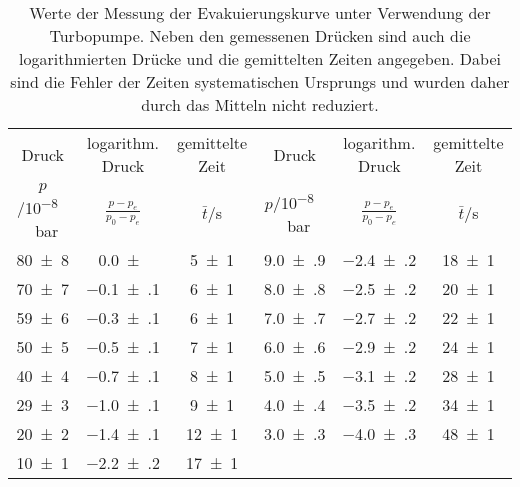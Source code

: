 \begin{table}[!h]
	\centering
	\begin{tabular}{cccccc}
		\toprule
		Druck & logarithm. Druck & gemittelte Zeit & Druck & logarithm. Druck & gemittelte Zeit\\
		$p$/\si{10^{-8}\,bar} & $\frac{p-p_e}{p_0-p_e}$ & $\bar{t}$/\si{s} & $p$/\si{10^{-8}\,bar} & $\frac{p-p_e}{p_0-p_e}$ & $\bar{t}$/\si{s}\\
\midrule
		\num{80(8)} & \num{0.0(0)} & \num{5(1)} & \num{9.0(9)} & \num{-2.4(2)} & \num{18(1)}\\
		\num{70(7)} & \num{-0.1(1)} & \num{6(1)} & \num{8.0(8)} & \num{-2.5(2)} & \num{20(1)}\\
		\num{59(6)} & \num{-0.3(1)} & \num{6(1)} & \num{7.0(7)} & \num{-2.7(2)} & \num{22(1)}\\
		\num{50(5)} & \num{-0.5(1)} & \num{7(1)} & \num{6.0(6)} & \num{-2.9(2)} & \num{24(1)}\\
		\num{40(4)} & \num{-0.7(1)} & \num{8(1)} & \num{5.0(5)} & \num{-3.1(2)} & \num{28(1)}\\
		\num{29(3)} & \num{-1.0(1)} & \num{9(1)} & \num{4.0(4)} & \num{-3.5(2)} & \num{34(1)}\\
		\num{20(2)} & \num{-1.4(1)} & \num{12(1)} & \num{3.0(3)} & \num{-4.0(3)} & \num{48(1)}\\
		\num{10(1)} & \num{-2.2(2)} & \num{17(1)}\\
		\bottomrule
	\end{tabular}
	\caption{Werte der Messung der Evakuierungskurve unter Verwendung der Turbopumpe.
                        Neben den gemessenen Drücken sind auch die logarithmierten Drücke und die gemittelten
                        Zeiten angegeben. Dabei sind die Fehler der Zeiten systematischen Ursprungs und wurden 
                        daher durch das Mitteln nicht reduziert. \label{tab:Evakuierungskurve_Turbo}}
\end{table}
